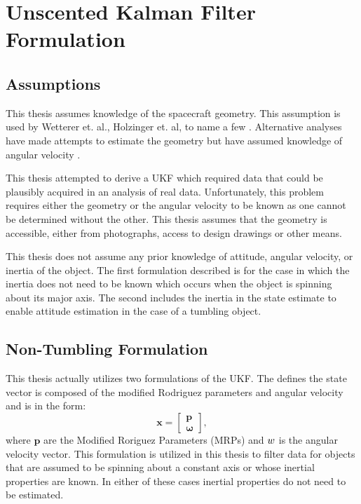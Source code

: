 \chapter{Unscented Kalman Filter Formulation}

\section{Assumptions}

This thesis assumes knowledge of the spacecraft geometry. This assumption is used by Wetterer et. al., Holzinger et. al, to name a few \cite{wetterer_ukf} \cite{Holzinger2012AttitudeEF}. Alternative analyses have made attempts to estimate the geometry but have assumed knowledge of angular velocity \cite{Kaasalainen_LCI} \cite{SpaceObjectCharacterization} \cite{Bradley2014LIGHTCURVEIF} \cite{Fulcoly} .

This thesis attempted to derive a UKF which required data that could be plausibly acquired in an analysis of real data. Unfortunately, this problem requires either the geometry or the angular velocity to be known as one cannot be determined without the other. This thesis assumes that the geometry is accessible, either from photographs, access to design drawings or other means.

This thesis does not assume any prior knowledge of attitude, angular velocity, or inertia of the object. The first formulation described is for the case in which the inertia does not need to be known which occurs when the object is spinning about its major axis. The second includes the inertia in the state estimate to enable attitude estimation in the case of a tumbling object.

\section{Non-Tumbling Formulation}
This thesis actually utilizes two formulations of the UKF. The defines the state vector is composed of the modified Rodriguez parameters and angular velocity and is in the form:
\begin{equation}
\bm{x} = \begin{bmatrix} \bm{p} \\ \bm{\omega} \end{bmatrix},
\end{equation}
where $\bm{p}$ are the Modified Roriguez Parameters (MRPs) and  $\boldmath{w}$ is the angular velocity vector. This formulation is utilized in this thesis to filter data for objects that are assumed to be spinning about a constant axis or whose inertial properties are known. In either of these cases inertial properties do not need to be estimated.

